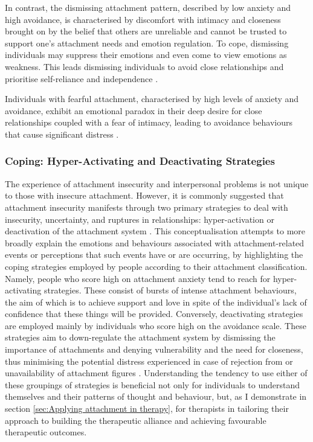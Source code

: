 \documentclass[12pt]{report}
\begin{document}
In contrast, the dismissing attachment pattern, described by low anxiety and high avoidance, is characterised by discomfort with intimacy and closeness brought on by the belief that others are unreliable and cannot be trusted to support one's attachment needs and emotion regulation.
To cope, dismissing individuals may suppress their emotions and even come to view emotions as weakness.
This leads dismissing individuals to avoid close relationships and prioritise self-reliance and independence \cite{Mikulincer2013,Hudson2020}.

Individuals with fearful attachment, characterised by high levels of anxiety and avoidance, exhibit an emotional paradox in their deep desire for close relationships coupled with a fear of intimacy, leading to avoidance behaviours that cause significant distress \cite{Bartholomew1991}.

\subsubsection*{Coping: Hyper-Activating and Deactivating Strategies}
The experience of attachment insecurity and interpersonal problems is not unique to those with insecure attachment.
However, it is commonly suggested that attachment insecurity manifests through two primary strategies to deal with insecurity, uncertainty, and ruptures in relationships: hyper-activation or deactivation of the attachment system \cite{Mikulincer2003, Mikulincer2013,Tyrrell1999, Slade2016}.
This conceptualisation attempts to more broadly explain the emotions and behaviours associated with attachment-related events or perceptions that such events have or are occurring, by highlighting the coping strategies employed by people according to their attachment classification.
Namely, people who score high on attachment anxiety tend to reach for hyper-activating strategies.
These consist of bursts of intense attachment behaviours, the aim of which is to achieve support and love in spite of the individual's lack of confidence that these things will be provided.
Conversely, deactivating strategies are employed mainly by individuals who score high on the avoidance scale.
These strategies aim to down-regulate the attachment system by dismissing the importance of attachments and denying vulnerability and the need for closeness, thus minimising the potential distress experienced in case of rejection from or unavailability of attachment figures \cite{Mikulincer2003}.
Understanding the tendency to use either of these groupings of strategies is beneficial not only for individuals to understand themselves and their patterns of thought and behaviour, but, as I demonstrate in section \ref{sec:Applying attachment in therapy}, for therapists in tailoring their approach to building the therapeutic alliance and achieving favourable therapeutic outcomes.
\end{document}
